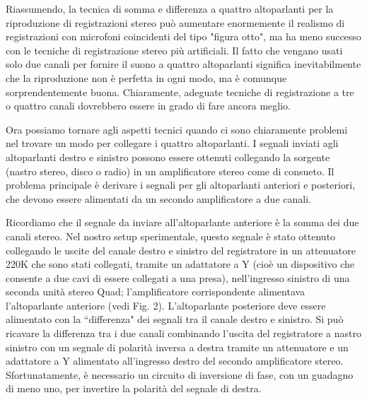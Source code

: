 \documentclass[11pt]{article}
\begin{document}
\begin{multicols*}{2}
Riassumendo, la tecnica di somma e differenza a quattro altoparlanti per la riproduzione di registrazioni stereo può aumentare enormemente il realismo di registrazioni con microfoni coincidenti del tipo "figura otto", ma ha meno successo con le tecniche di registrazione stereo più artificiali. Il fatto che vengano usati solo due canali per fornire il suono a quattro altoparlanti significa inevitabilmente che la riproduzione non è perfetta in ogni modo, ma è comunque sorprendentemente buona. Chiaramente, adeguate tecniche di registrazione a tre o quattro canali dovrebbero essere in grado di fare ancora meglio.

Ora possiamo tornare agli aspetti tecnici quando ci sono chiaramente problemi nel trovare un modo per collegare i quattro altoparlanti. I segnali inviati agli altoparlanti destro e sinistro possono essere ottenuti collegando la sorgente (nastro stereo, disco o radio) in un amplificatore stereo come di consueto. Il problema principale è derivare i segnali per gli altoparlanti anteriori e posteriori, che devono essere alimentati da un secondo amplificatore a due canali.

Ricordiamo che il segnale da inviare all'altoparlante anteriore è la somma dei due canali stereo. Nel nostro setup sperimentale, questo segnale è stato ottenuto collegando le uscite del canale destro e sinistro del registratore in un attenuatore 220K che sono stati collegati, tramite un adattatore a Y (cioè un dispositivo che consente a due cavi di essere collegati a una presa), nell’ingresso sinistro di una seconda unità stereo Quad; l'amplificatore corrispondente alimentava l'altoparlante anteriore (vedi Fig. 2). L'altoparlante posteriore deve essere alimentato con la “differenza" dei segnali tra il canale destro e sinistro. Si può ricavare la differenza tra i due canali combinando l'uscita del registratore a nastro sinistro con un segnale di polarità inversa a destra tramite un attenuatore e un adattatore a Y alimentato all'ingresso destro del secondo amplificatore stereo. Sfortunatamente, è necessario un circuito di inversione di fase, con un guadagno di meno uno, per invertire la polarità del segnale di destra.


\end{multicols*}
\end{document}
